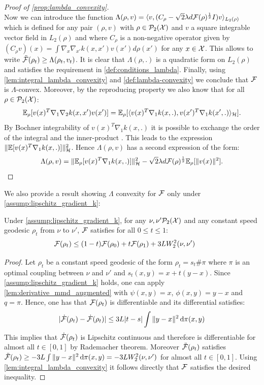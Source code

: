 \begin{proof}[Proof of \cref{prop:lambda_convexity}]
\[\]
Now we can introduce the function $\Lambda(\rho,v) = \langle v ,( C_{\rho} -\sqrt{2}\lambda d {{\mathcal F}}(\rho)^{\frac{1}{2}} I) v \rangle_{L_2(\rho)}$
which is defined for any pair $(\rho,v)$ with  $\rho\in \mathcal{P}_2({{\mathcal X}})$ and $v$ a square integrable vector field in $L_2(\rho)$ and where $C_{\rho}$ is a non-negative operator given by  $(C_{\rho}v)(x)=\int\nabla_{x}\nabla_{x'}k(x,x')v(x')d\rho(x')$ for any $x \in {{\mathcal X}}$.
This allows to write $\ddot{{{\mathcal F}}}(\rho_t) \geq \Lambda(\rho_t,v_t)$.
It is clear that $\Lambda(\rho,.)$  is a quadratic form on $L_2(\rho)$ and satisfies the requirement in \cref{def:conditions_lambda}.
Finally, using \cref{lem:integral_lambda_convexity} and \cref{def:lambda-convexity} we conclude that ${{\mathcal F}}$ is $\Lambda$-convex. Moreover, by the reproducing property we also know that for all $\rho \in \mathcal{P}_2({{\mathcal X}})$:
\[ \mathbb{E}_{\rho}[ v(x)^T \nabla_1 \nabla_2 k(x,x') v(x') ]   = \mathbb{E}_{\rho}[\langle  v(x)^T \nabla_1 k(x,.),  v(x')^T \nabla_1k(x',.) \rangle_{{{\mathcal H}}}].
\] 
By Bochner integrability of $v(x)^T \nabla_1 k(x,.)$ it is possible to exchange the order of the integral and the inner-product \cite[Theorem 6]{Retherford:1978}. This leads to the expression $\Vert \mathbb{E}[v(x)^T \nabla_1 k(x,.)]\Vert^2_{{{\mathcal H}}}$. Hence $\Lambda(\rho,v)$ has a second expression of the form:
\[
\Lambda(\rho,v) = \Vert \mathbb{E}_{\rho}[v(x)^T \nabla_1 k(x,.)]\Vert^2_{{{\mathcal H}}} - \sqrt{2}\lambda d {{\mathcal F}}(\rho)^{\frac{1}{2}}\mathbb{E}_{\rho}[\Vert v(x)\Vert^2 ].
\]
\end{proof}

We also provide a result showing $\Lambda$ convexity for ${{\mathcal F}}$ only under \cref{assump:lipschitz_gradient_k}:

\begin{lemma}\label{lem:lambda_convexity_bis}
	Under \cref{assump:lipschitz_gradient_k}, for any $\nu,\nu'\mathcal{P}_2({{\mathcal X}})$ and any constant speed geodesic $\rho_t$ from $\nu$ to $\nu'$, ${{\mathcal F}}$ satisfies for all $0\leq t\leq 1$:
	\[
	{{\mathcal F}}(\rho_t) \leq (1-t){{\mathcal F}}(\rho_0) + t{{\mathcal F}}(\rho_1) + 3L W_2^2(\nu,\nu') \qquad 
	\]
\end{lemma}

\begin{proof}
Let $\rho_t$ be a constant speed geodesic of the form $\rho_t = s_t{\#}\pi$ where $\pi$ is an optimal coupling between $\nu$ and $\nu'$ and $s_t(x,y) = x + t(y-x)$.
Since \cref{assump:lipschitz_gradient_k} holds, one can apply \cref{lem:derivative_mmd_augmented} with $\psi(x,y) =x $, $\phi(x,y)= y-x$ and  $q = \pi$. Hence, one has that ${{\mathcal F}}(\rho_t)$ is differentiable and its differential satisfies:
	\[
	\vert \dot{{{\mathcal F}}}(\rho_t) - \dot{{{\mathcal F}}}(\rho_t) \vert  \leq 3L\vert t-s \vert \int \Vert y-x\Vert^2\mathop{}\!\mathrm{d} \pi(x,y)   
	\]
	This implies that $\dot{{{\mathcal F}}}(\rho_t)$ is Lipschitz continuous and therefore is differentiable for almost all $t\in [0,1]$ by Rademacher theorem. Moreover $\ddot{{{\mathcal F}}}(\rho_t)$ satisfies $\ddot{{{\mathcal F}}}(\rho_t)\geq - 3L \int \Vert y-x\Vert^2\mathop{}\!\mathrm{d} \pi(x,y) = -3LW_2^2(\nu,\nu')$ for almost all $t\in [0,1]$. Using \cref{lem:integral_lambda_convexity} it follows directly that ${{\mathcal F}}$ satisfies the desired inequality.
\end{proof}


